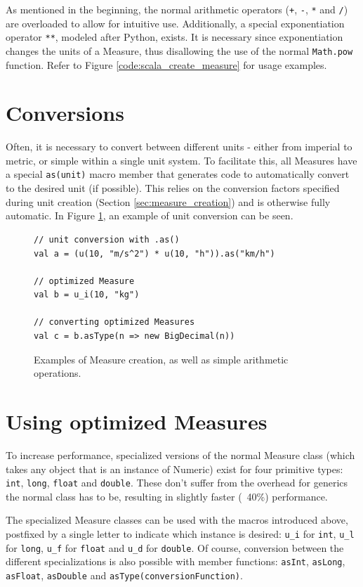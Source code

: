 \documentclass[12pt,oneside,a4paper]{scrbook}
\begin{document}
As mentioned in the beginning, the normal arithmetic operators (\verb|+|, \verb|-|, \verb|*| and \verb|/|) are overloaded to allow for intuitive use. Additionally, a special exponentiation operator \verb|**|, modeled after Python, exists. It is necessary since exponentiation changes the units of a Measure, thus disallowing the use of the normal \verb|Math.pow| function. Refer to Figure \ref{code:scala_create_measure} for usage examples.

\section{Conversions}

Often, it is necessary to convert between different units - either from imperial to metric, or simple within a single unit system. To facilitate this, all Measures have a special \verb|as(unit)| macro member that generates code to automatically convert to the desired unit (if possible). This relies on the conversion factors specified during unit creation (Section \ref{sec:measure_creation}) and is otherwise fully automatic. In Figure \ref{code:scala_measure_conversion}, an example of unit conversion can be seen.

\begin{figure}
\begin{verbatim}
// unit conversion with .as()
val a = (u(10, "m/s^2") * u(10, "h")).as("km/h")

// optimized Measure
val b = u_i(10, "kg")

// converting optimized Measures
val c = b.asType(n => new BigDecimal(n))
\end{verbatim}
\caption{Examples of Measure creation, as well as simple arithmetic operations.}
\label{code:scala_measure_conversion}
\end{figure}

\section{Using optimized Measures}

To increase performance, specialized versions of the normal Measure class (which takes any object that is an instance of Numeric) exist for four primitive types: \verb|int|, \verb|long|, \verb|float| and \verb|double|. These don't suffer from the overhead for generics the normal class has to be, resulting in slightly faster (~40\%) performance.

The specialized Measure classes can be used with the macros introduced above, postfixed by a single letter to indicate which instance is desired: \verb|u_i| for \verb|int|, \verb|u_l| for \verb|long|, \verb|u_f| for \verb|float| and \verb|u_d| for \verb|double|. Of course, conversion between the different specializations is also possible with member functions: \verb|asInt|, \verb|asLong|, \verb|asFloat|, \verb|asDouble| and \verb|asType(conversionFunction)|.
\end{document}
